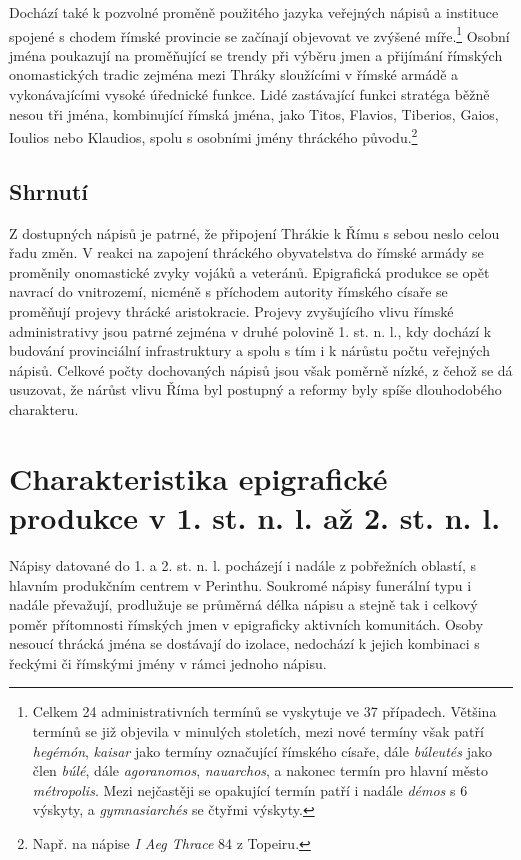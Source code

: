 Dochází také k pozvolné proměně použitého jazyka veřejných nápisů a instituce spojené s chodem římské provincie se začínají objevovat ve zvýšené míře.\footnote{Celkem 24 administrativních termínů se vyskytuje ve 37 případech. Většina termínů se již objevila v minulých stoletích, mezi nové termíny však patří {\em hegémón}, {\em kaisar} jako termíny označující římského císaře, dále {\em búleutés} jako člen {\em búlé}, dále {\em agoranomos}, {\em nauarchos}, a nakonec termín pro hlavní město {\em métropolis}. Mezi nejčastěji se opakující termín patří i nadále {\em démos} s 6 výskyty, a {\em gymnasiarchés} se čtyřmi výskyty.} Osobní jména poukazují na proměňující se trendy při výběru jmen a přijímání římských onomastických tradic zejména mezi Thráky sloužícími v římské armádě a vykonávajícími vysoké úřednické funkce. Lidé zastávající funkci stratéga běžně nesou tři jména, kombinující římská jména, jako Titos, Flavios, Tiberios, Gaios, Ioulios nebo Klaudios, spolu s osobními jmény thráckého původu.\footnote{Např. na nápise {\em I Aeg Thrace} 84 z Topeiru.}

\subsection[shrnutí-15]{Shrnutí}

Z dostupných nápisů je patrné, že připojení Thrákie k Římu s sebou neslo celou řadu změn. V reakci na zapojení thráckého obyvatelstva do římské armády se proměnily onomastické zvyky vojáků a veteránů. Epigrafická produkce se opět navrací do vnitrozemí, nicméně s příchodem autority římského císaře se proměňují projevy thrácké aristokracie. Projevy zvyšujícího vlivu římské administrativy jsou patrné zejména v druhé polovině 1. st. n. l., kdy dochází k budování provinciální infrastruktury a spolu s tím i k nárůstu počtu veřejných nápisů. Celkové počty dochovaných nápisů jsou však poměrně nízké, z čehož se dá usuzovat, že nárůst vlivu Říma byl postupný a reformy byly spíše dlouhodobého charakteru.

\section[charakteristika-epigrafické-produkce-v-1.-st.-n.-l.-až-2.-st.-n.-l.]{Charakteristika epigrafické produkce v 1. st. n. l. až 2. st. n. l.}

Nápisy datované do 1. a 2. st. n. l. pocházejí i nadále z pobřežních oblastí, s hlavním produkčním centrem v Perinthu. Soukromé nápisy funerální typu i nadále převažují, prodlužuje se průměrná délka nápisu a stejně tak i celkový poměr přítomnosti římských jmen v epigraficky aktivních komunitách. Osoby nesoucí thrácká jména se dostávají do izolace, nedochází k jejich kombinaci s řeckými či římskými jmény v rámci jednoho nápisu.

